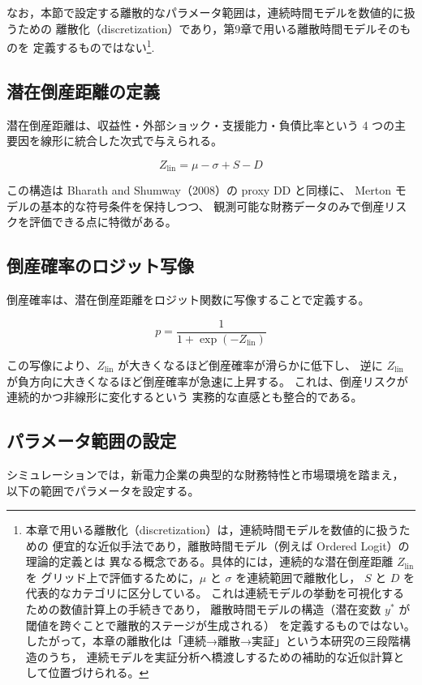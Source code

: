なお，本節で設定する離散的なパラメータ範囲は，連続時間モデルを数値的に扱うための
離散化（discretization）であり，第9章で用いる離散時間モデルそのものを
定義するものではない\footnote{
本章で用いる離散化（discretization）は，連続時間モデルを数値的に扱うための
便宜的な近似手法であり，離散時間モデル（例えば Ordered Logit）の理論的定義とは
異なる概念である。具体的には，連続的な潜在倒産距離 $Z_{\text{lin}}$ を
グリッド上で評価するために，$\mu$ と $\sigma$ を連続範囲で離散化し，
$S$ と $D$ を代表的なカテゴリに区分している。
これは連続モデルの挙動を可視化するための数値計算上の手続きであり，
離散時間モデルの構造（潜在変数 $y^*$ が閾値を跨ぐことで離散的ステージが生成される）
を定義するものではない。
したがって，本章の離散化は「連続→離散→実証」という本研究の三段階構造のうち，
連続モデルを実証分析へ橋渡しするための補助的な近似計算として位置づけられる。
}.




\subsection*{潜在倒産距離の定義}

潜在倒産距離は、収益性・外部ショック・支援能力・負債比率という
4 つの主要因を線形に統合した次式で与えられる。


\[
Z_{\text{lin}} = \mu - \sigma + S - D
\]


この構造は Bharath and Shumway（2008）の proxy DD と同様に、
Merton モデルの基本的な符号条件を保持しつつ、
観測可能な財務データのみで倒産リスクを評価できる点に特徴がある。

\subsection*{倒産確率のロジット写像}

倒産確率は、潜在倒産距離をロジット関数に写像することで定義する。


\[
p = \frac{1}{1 + \exp(-Z_{\text{lin}})}
\]


この写像により、$Z_{\text{lin}}$ が大きくなるほど倒産確率が滑らかに低下し、
逆に $Z_{\text{lin}}$ が負方向に大きくなるほど倒産確率が急速に上昇する。
これは、倒産リスクが連続的かつ非線形に変化するという
実務的な直感とも整合的である。

\subsection*{パラメータ範囲の設定}
シミュレーションでは，新電力企業の典型的な財務特性と市場環境を踏まえ，
以下の範囲でパラメータを設定する。

